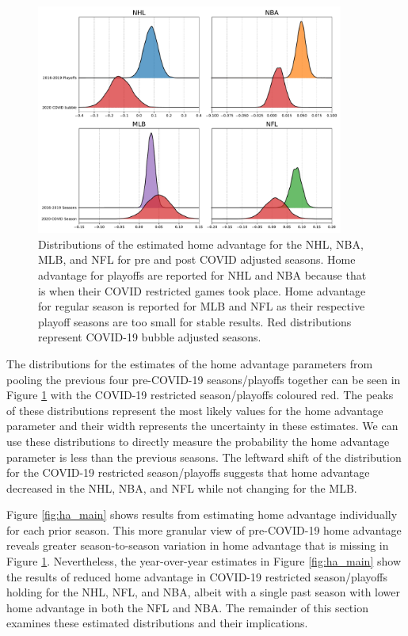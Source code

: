 \begin{figure}
	\centering
	\includegraphics[width=0.9\textwidth]{figures/Figure_1.pdf}
	\caption{Distributions of the estimated home advantage for the NHL, NBA, MLB, and NFL for pre and post COVID adjusted seasons. Home advantage for playoffs are reported for NHL and NBA because that is when their COVID restricted games took place. Home advantage for regular season is reported for MLB and NFL as their respective playoff seasons are too small for stable results. Red distributions represent COVID-19 bubble adjusted seasons.}
	\label{fig:ha_pooled}
\end{figure}

The distributions for the estimates of the home advantage parameters from pooling the previous four pre-COVID-19 seasons/playoffs together can be seen in Figure \mbox{\ref{fig:ha_pooled}} with the COVID-19 restricted season/playoffs coloured red. The peaks of these distributions represent the most likely values for the home advantage parameter and their width represents the uncertainty in these estimates. We can use these distributions to directly measure the probability the home advantage parameter is less than the previous seasons. The leftward shift of the distribution for the COVID-19 restricted season/playoffs suggests that home advantage decreased in the NHL, NBA, and NFL while not changing for the MLB.

Figure \mbox{\ref{fig:ha_main}} shows results from estimating home advantage individually for each prior season. This more granular view of pre-COVID-19 home advantage reveals greater season-to-season variation in home advantage that is missing in Figure \mbox{\ref{fig:ha_pooled}}. Nevertheless, the year-over-year estimates in Figure \mbox{\ref{fig:ha_main}} show the results of reduced home advantage in COVID-19 restricted season/playoffs holding for the NHL, NFL, and NBA, albeit with a single past season with lower home advantage in both the NFL and NBA. The remainder of this section examines these estimated distributions and their implications.

